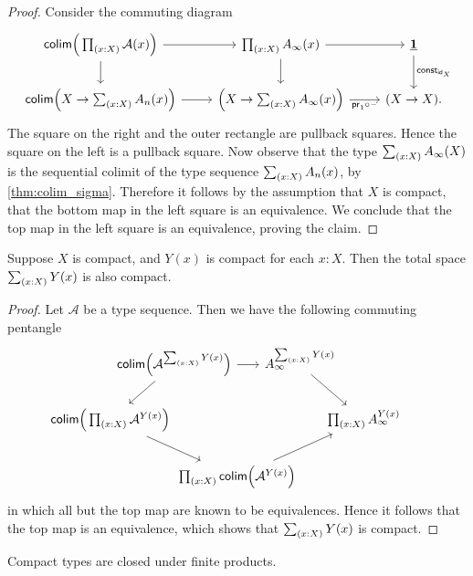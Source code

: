 \begin{proof}
Consider the commuting diagram
\begin{equation*}
\begin{tikzcd}
\mathsf{colim}\Big(\prd{x:X}\mathcal{A}(x)\Big) \arrow[d] \arrow[r] & \prd{x:X}A_\infty(x) \arrow[d] \arrow[r] & \unit \arrow[d,"\mathsf{const}_{\idfunc[X]}"] \\
\mathsf{colim}\Big(X\to\sm{x:X}A_n(x)\Big) \arrow[r] & \Big(X\to \sm{x:X}A_\infty(x)\Big) \arrow[r,swap,"\proj 1\circ\blank"] & (X\to X).
\end{tikzcd}
\end{equation*}
The square on the right and the outer rectangle are pullback squares. Hence the square on the left is a pullback square. Now observe that the type $\sm{x:X}A_\infty(X)$ is the sequential colimit of the type sequence $\sm{x:X}A_n(x)$, by \cref{thm:colim_sigma}. Therefore it follows by the assumption that $X$ is compact, that the bottom map in the left square is an equivalence. We conclude that the top map in the left square is an equivalence, proving the claim.
\end{proof}

\begin{cor}
Suppose $X$ is compact, and $Y(x)$ is compact for each $x:X$. Then the total space $\sm{x:X}Y(x)$ is also compact.
\end{cor}

\begin{proof}
Let $\mathcal{A}$ be a type sequence. Then we have the following commuting pentangle
\begin{equation*}
\begin{tikzcd}[column sep=-5em]
& \mathsf{colim}\Big(\mathcal{A}^{\sm{x:X}Y(x)}\Big) \arrow[rr] \arrow[dl] & & A_\infty^{\sm{x:X}Y(x)} \arrow[dr] \\
\mathsf{colim}\Big(\prd{x:X}\mathcal{A}^{Y(x)}\Big) \arrow[drr] & & & & \prd{x:X} A_\infty^{Y(x)} \\
& & \prd{x:X}\mathsf{colim}\Big(\mathcal{A}^{Y(x)}\Big) \arrow[urr] & \phantom{\mathsf{colim}\Big(\mathcal{A}^{\sm{x:X}Y(x)}\Big)} & \phantom{\mathsf{colim}\Big(\prd{x:X}\mathcal{A}^{Y(x)}\Big)}
\end{tikzcd}
\end{equation*}
in which all but the top map are known to be equivalences. Hence it follows that the top map is an equivalence, which shows that $\sm{x:X}Y(x)$ is compact.
\end{proof}

\begin{cor}
Compact types are closed under finite products.
\end{cor}

